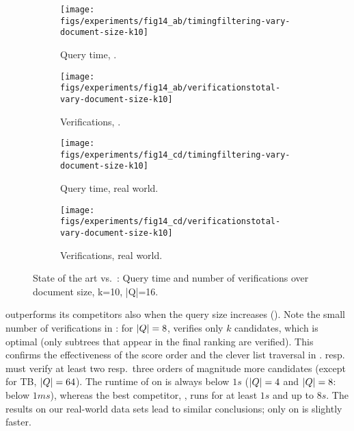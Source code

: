 \begin{figure*}[ht!]
  \centering
  \begin{subfigure}[b]{0.225\textwidth}
    \centering
    \texttt{[image: figs/experiments/fig14\_ab/timingfiltering-vary-document-size-k10]}
    \caption{Query time, \xmark.}
    \label{fig:tasm-struct-slim-timingfiltering-vary-document-size-k10-synthetic}
  \end{subfigure}
  \quad
  \begin{subfigure}[b]{0.225\textwidth}
    \centering
    \texttt{[image: figs/experiments/fig14\_ab/verificationstotal-vary-document-size-k10]}
    \caption{Verifications, \xmark.}
    \label{fig:tasm-struct-slim-verificationstotal-vary-document-size-k10-synthetic}
  \end{subfigure}
  \quad
  \begin{subfigure}[b]{0.225\textwidth}
    \centering
    \texttt{[image: figs/experiments/fig14\_cd/timingfiltering-vary-document-size-k10]}
    \caption{Query time, real world.}
    \label{fig:tasm-struct-slim-timingfiltering-vary-document-size-k10-realworld}
  \end{subfigure}
  \quad
  \begin{subfigure}[b]{0.225\textwidth}
    \centering
    \texttt{[image: figs/experiments/fig14\_cd/verificationstotal-vary-document-size-k10]}
    \caption{Verifications, real world.}
    \label{fig:tasm-struct-slim-verificationstotal-vary-document-size-k10-realworld}
  \end{subfigure}
  \caption{State of the art vs.\ \shinconeshort{}: Query time and number of verifications  over document size, k=10, |Q|=16.}
  \label{fig:tasm-struct-slim-timingfiltering-verificationstotal-vary-document-size-k10}
\end{figure*}

\shinconeshort{} outperforms its competitors also when the query size increases ().
%
Note the small number of verifications in : for $\left| Q \right| = 8$, \shinconeshort{} verifies only $k$ candidates, which is optimal (only subtrees that appear in the final ranking are verified). This confirms the effectiveness of the score order and the clever list traversal in \shinconeshort{}. \structuresearchshort{} resp.\ \tasmpostordershort{} must verify at least two resp.\ three orders of magnitude more candidates (except for TB, $\left| Q \right| = 64$).
%
The runtime of \shinconeshort{} on  is always below $1s$ ($\left| Q \right| = 4$ and $\left| Q \right| = 8$: below $1ms$), whereas the best competitor, \structuresearchshort, runs for at least $1s$ and up to $8s$. The results on our real-world data sets lead to similar conclusions; only on \dblp{} \structuresearchshort{} is slightly faster.

